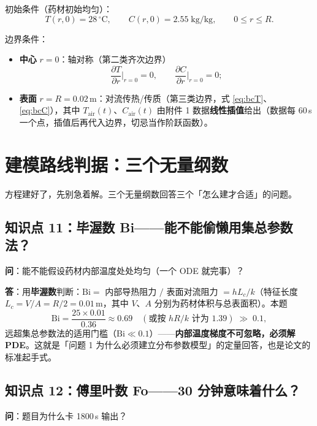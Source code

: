 \documentclass[12pt,a4paper]{ctexart}
\begin{document}
初始条件（药材初始均匀）：
\begin{equation}
T(r,0)=28\,^\circ\text{C},\qquad C(r,0)=2.55\;\text{kg/kg},\qquad 0\le r\le R.
\end{equation}

边界条件：
\begin{itemize}[leftmargin=2.5em]
\item \textbf{中心} $r=0$：轴对称（第二类齐次边界）
\begin{equation}
\frac{\partial T}{\partial r}\bigg|_{r=0}=0,\qquad \frac{\partial C}{\partial r}\bigg|_{r=0}=0;
\end{equation}
\item \textbf{表面} $r=R=0.02$\,m：对流传热/传质（第三类边界，式 \eqref{eq:bcT}、\eqref{eq:bcC}），其中 $T_{\mathrm{air}}(t)$、$C_{\mathrm{air}}(t)$ 由附件 1 数据\textbf{线性插值}给出（数据每 60\,s 一个点，插值后再代入边界，切忌当作阶跃函数）。
\end{itemize}

\section{建模路线判据：三个无量纲数}

方程建好了，先别急着解。三个无量纲数回答三个「怎么建才合适」的问题。

\subsection{知识点 11：毕渥数 Bi——能不能偷懒用集总参数法？}

\textbf{问}：能不能假设药材内部温度处处均匀（一个 ODE 就完事）？

\textbf{答}：用\textbf{毕渥数}判断：$\mathrm{Bi}=$ 内部导热阻力 $/$ 表面对流阻力 $=hL_c/k$（特征长度 $L_c=V/A=R/2=0.01$\,m，其中 $V$、$A$ 分别为药材体积与总表面积）。本题
\begin{equation}
\mathrm{Bi}=\frac{25\times0.01}{0.36}\approx0.69\quad(\text{或按 }hR/k\text{ 计为 }1.39)\;\gg\;0.1,
\end{equation}
远超集总参数法的适用门槛（$\mathrm{Bi}\ll0.1$）——\textbf{内部温度梯度不可忽略，必须解 PDE}。这就是「问题 1 为什么必须建立分布参数模型」的定量回答，也是论文的标准起手式。

\subsection{知识点 12：傅里叶数 Fo——30 分钟意味着什么？}

\textbf{问}：题目为什么卡 1800\,s 输出？
\end{document}
